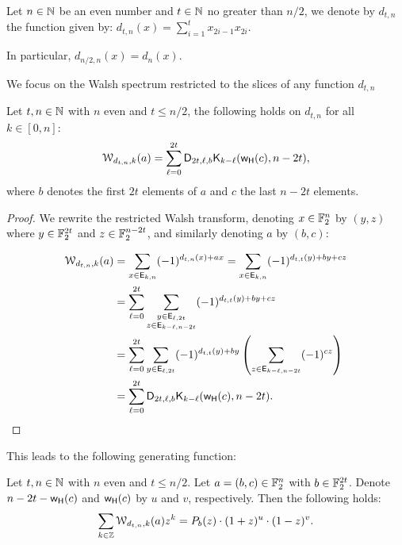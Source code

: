 \documentclass[11pt]{llncs}
\begin{document}
\begin{definition}
	Let $n\in \mathbb{N}$ be an even number and $t \in \mathbb{N} $ no greater than $n/2$, we denote by $d_{t,n}$ the function given by: $d_{t,n}(x)=\sum_{i=1}^t x_{2i-1} x_{2i}$.
	
\end{definition}

In particular, $d_{n/2,n}(x)=d_n(x)$. 

We focus on the Walsh spectrum restricted to the slices of any function $d_{t,n}$

\begin{proposition}\label{proposition:dtn}
	Let $t, n\in \mathbb{N}$ with $n$ even and $t\le n/2$, the following holds on $d_{t,n}$ for all $k\in [0,n]$:
	\[\mathcal{W}_{d_{t,n},k}(a)=\sum_{\ell=0}^{2t} \mathsf{D}_{2t,\ell,b} \mathsf{K}_{k-\ell}(\mathsf{w_H}(c),n-2t),\]
	where $b$ denotes the first $2t$ elements of $a$ and $c$ the last $n-2t$ elements.
\end{proposition}
\begin{proof}
	We rewrite the restricted Walsh transform, denoting $x\in \mathbb{F}_2^n$ by $(y,z)$ where $y\in \mathbb{F}_2^{2t}$ and $z \in \mathbb{F}_2^{n-2t}$, and similarly denoting $a$ by $(b,c)$:
	
	\begin{align*}
	\mathcal{W}_{d_{t,n},k}(a)&=\sum_{x \in \mathsf{E}_{k,n}} (-1)^{d_{t,n}(x)+ax}=\sum_{x \in \mathsf{E}_{k,n}} (-1)^{d_{t,t}(y)+by +cz}\\
	&=\sum_{\ell=0}^{2t} \sum_{\substack{y \in \mathsf{E}_{\ell,2t}\\z \in \mathsf{E}_{k-\ell,n-2t}}} (-1)^{d_{t,t}(y)+by +cz}\\
	&=\sum_{\ell=0}^{2t} \sum_{y \in \mathsf{E}_{\ell,2t}} (-1)^{d_{t,t}(y)+by} \left( \sum_{z \in \mathsf{E}_{k-\ell,n-2t}} (-1)^{cz}\right)\\
	&=\sum_{\ell=0}^{2t} \mathsf{D}_{2t,\ell,b} \mathsf{K}_{k-\ell}(\mathsf{w_H}(c),n-2t).\qedhere
	\end{align*}	
\end{proof}

This leads to the following generating function:

\begin{proposition}
    Let $t, n\in \mathbb{N}$ with $n$ even and $t\le n/2$. Let $a=(b,c)\in\mathbb{F}_2^n$ with $b\in\mathbb{F}_2^{2t}$. Denote $n-2t-\mathsf{w_H}(c)$ and $\mathsf{w_H}(c)$ by $u$ and $v$, respectively. Then the following holds:
    \[
        \sum_{k\in\mathbb{Z}}\mathcal{W}_{d_{t,n},k}(a)z^k=P_b(z)\cdot(1+z)^u\cdot(1-z)^v.
    \]
\end{proposition}
\end{document}

